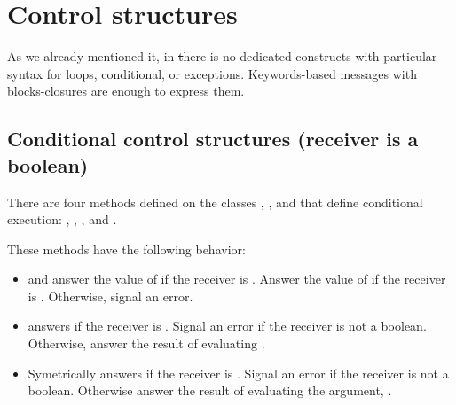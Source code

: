 \documentclass[a4paper,10pt,twoside]{book}
\begin{document}
\section{Control structures}


As we already mentioned it, in \st  there is no dedicated constructs with particular syntax for loops, 
conditional, or exceptions. Keywords-based messages with blocks-closures are enough
to express them. 

\subsection{Conditional control structures (receiver is a boolean)}
There are four methods defined on the classes , , and  that define conditional execution: , , , and . 

These methods have the following behavior:

\begin{itemize}
\item {} and  answer the value of  if the receiver is . Answer the value of  if the receiver is . Otherwise, signal an error. 

\item {} answers  if the receiver is . Signal an error 
if the receiver is not a boolean. Otherwise, answer the result of evaluating .

\item 
Symetrically  answers  if the receiver is . Signal an error if the receiver is not a boolean. Otherwise answer the result of evaluating the argument, .
\end{itemize}
\end{document}
